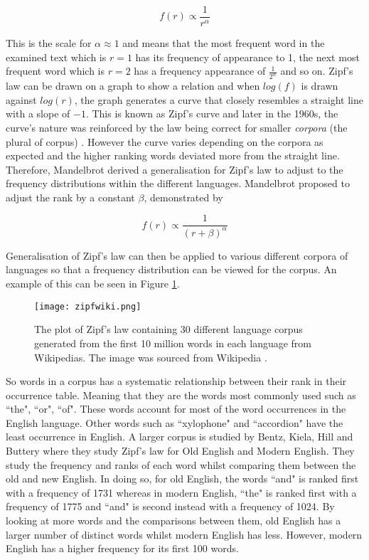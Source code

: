 \begin{equation}\label{eq:zipfs}
f(r) \propto \frac{1}{r^{\alpha}}
\end{equation}

This is the scale for $\alpha \approx 1$ and means that the most frequent word in the examined text which is $r = 1$ has its frequency of appearance to 1, the next most frequent word which is $r = 2$ has a frequency appearance of $\frac{1}{2^{\alpha}}$ and so on. Zipf's law can be drawn on a graph to show a relation and when $log(f)$ is drawn against $log(r)$, the graph generates a curve that closely resembles a straight line with a slope of $-1$. This is known as Zipf's curve and later in the 1960s, the curve's nature was reinforced by the law being correct for smaller \emph{corpora} (the plural of corpus) \cite{sicilia2002extension}. However the curve varies depending on the corpora as expected and the higher ranking words deviated more from the straight line. Therefore, Mandelbrot derived a generalisation for Zipf's law to adjust to the frequency distributions within the different languages. Mandelbrot proposed to adjust the rank by a constant $\beta$, demonstrated by

\begin{equation}\label{eq:zipfs}
f(r) \propto \frac{1}{(r + \beta)^{\alpha}}
\end{equation}

Generalisation of Zipf's law can then be applied to various different corpora of languages so that a frequency distribution can be viewed for the corpus. An example of this can be seen in Figure \ref{fig:zipfwiki}.

\begin{figure}[!htb]
	\centering
	\texttt{[image: zipfwiki.png]}
	\caption{The plot of Zipf's law containing 30 different language corpus generated from the first 10 million words in each language from Wikipedias. The image was sourced from Wikipedia \cite{zipffigure}. }
	\label{fig:zipfwiki}
\end{figure}

So words in a corpus has a systematic relationship between their rank in their occurrence table. Meaning that they are the words most commonly used such as ``the", ``or", ``of". These words account for most of the word occurrences in the English language. Other words such as ``xylophone" and ``accordion" have the least occurrence in English. A larger corpus is studied by Bentz, Kiela, Hill and Buttery \cite{BentzKielaHillButtery} where they study Zipf's law for Old English and Modern English. They study the frequency and ranks of each word whilst comparing them between the old and new English. In doing so, for old English, the words ``and" is ranked first with a frequency of 1731 whereas in modern English, ``the" is ranked first with a frequency of 1775 and ``and" is second instead with a frequency of 1024. By looking at more words and the comparisons between them, old English has a larger number of distinct words whilst modern English has less. However, modern English has a higher frequency for its first 100 words.

